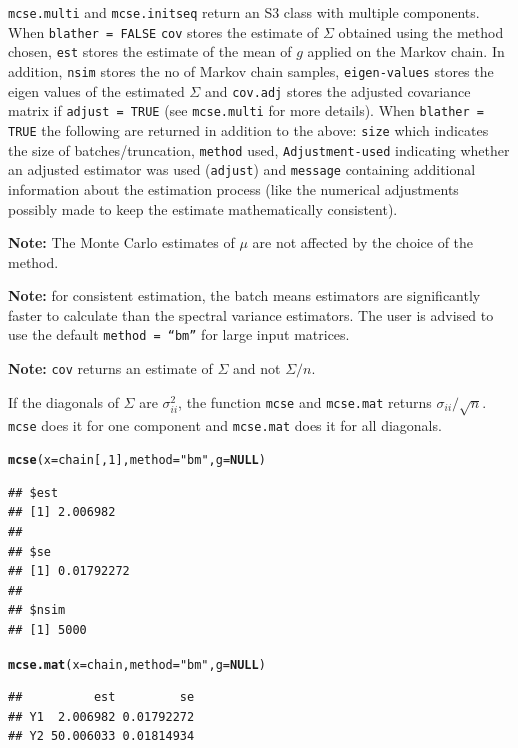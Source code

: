 \documentclass[11pt]{article}\usepackage[]{graphicx}\usepackage[]{color}
\makeatletter
\newcommand{\hlnum}[1]{\textcolor[rgb]{0.686,0.059,0.569}{#1}}%
\newcommand{\hlstr}[1]{\textcolor[rgb]{0.192,0.494,0.8}{#1}}%
\newcommand{\hlstd}[1]{\textcolor[rgb]{0.345,0.345,0.345}{#1}}%
\newcommand{\hlkwa}[1]{\textcolor[rgb]{0.161,0.373,0.58}{\textbf{#1}}}%
\newcommand{\hlkwc}[1]{\textcolor[rgb]{0.333,0.667,0.333}{#1}}%
\newcommand{\hlkwd}[1]{\textcolor[rgb]{0.737,0.353,0.396}{\textbf{#1}}}%
\newenvironment{kframe}{%
 \def\at@end@of@kframe{}%
 \ifinner\ifhmode%
  \def\at@end@of@kframe{\end{minipage}}%
  \begin{minipage}{\columnwidth}%
 \fi\fi%
 \def\FrameCommand##1{\hskip\@totalleftmargin \hskip-\fboxsep
 \colorbox{shadecolor}{##1}\hskip-\fboxsep
     \hskip-\linewidth \hskip-\@totalleftmargin \hskip\columnwidth}%
 \MakeFramed {\advance\hsize-\width
   \@totalleftmargin\z@ \linewidth\hsize
   \@setminipage}}%
 {\par\unskip\endMakeFramed%
 \at@end@of@kframe}
\newenvironment{knitrout}{}{} %
\makeatother
\begin{document}
\texttt{mcse.multi} and \texttt{mcse.initseq} return an S3 class with multiple components. When \texttt{blather = FALSE} \texttt{cov} stores the estimate of $\Sigma$ obtained using the method chosen, \texttt{est} stores the estimate of the mean of $g$ applied on the Markov chain. In addition, \texttt{nsim} stores the no of Markov chain samples, \texttt{eigen-values} stores the eigen values of the estimated $\Sigma$ and \texttt{cov.adj} stores the adjusted covariance matrix if \texttt{adjust = TRUE} (see \texttt{mcse.multi} for more details). When \texttt{blather = TRUE} the following are returned in addition to the above: \texttt{size} which indicates the size of batches/truncation, \texttt{method} used, \texttt{Adjustment-used} indicating whether an adjusted estimator was used (\texttt{adjust}) and \texttt{message} containing additional information about the estimation process (like the numerical adjustments possibly made to keep the estimate mathematically consistent).


  
\bigskip  
  
\textbf{Note: } The Monte Carlo estimates of $\mu$ are not affected by the choice of the method.

\bigskip
\textbf{Note: } for consistent estimation, the batch means estimators are significantly faster to calculate than the spectral variance estimators. The user is advised to use the default \texttt{method = ``bm''} for large input matrices.

\bigskip
\textbf{Note: }\texttt{cov} returns an estimate of $\Sigma$ and not $\Sigma/n$. 

\bigskip
If the diagonals of $\Sigma$ are $\sigma_{ii}^2$, the function \texttt{mcse} and \texttt{mcse.mat} returns $\sigma_{ii}/\sqrt{n}$. \texttt{mcse} does it for one component and \texttt{mcse.mat} does it for all diagonals.


\begin{knitrout}
\color{fgcolor}\begin{kframe}
\begin{alltt}
\hlkwd{mcse}\hlstd{(}\hlkwc{x} \hlstd{= chain[,}\hlnum{1}\hlstd{],} \hlkwc{method} \hlstd{=} \hlstr{"bm"}\hlstd{,} \hlkwc{g} \hlstd{=} \hlkwa{NULL}\hlstd{)}
\end{alltt}
\begin{verbatim}
## $est
## [1] 2.006982
## 
## $se
## [1] 0.01792272
## 
## $nsim
## [1] 5000
\end{verbatim}
\begin{alltt}
\hlkwd{mcse.mat}\hlstd{(}\hlkwc{x} \hlstd{= chain,} \hlkwc{method} \hlstd{=} \hlstr{"bm"}\hlstd{,} \hlkwc{g} \hlstd{=} \hlkwa{NULL}\hlstd{)}
\end{alltt}
\begin{verbatim}
##          est         se
## Y1  2.006982 0.01792272
## Y2 50.006033 0.01814934
\end{verbatim}
\end{kframe}
\end{knitrout}
  
\end{document}
